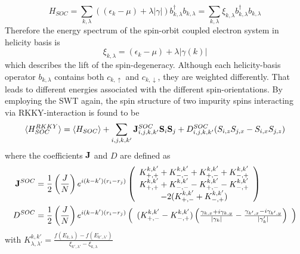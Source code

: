 \begin{equation}\label{eq:ham_nm+SOC}
    H_{SOC} = \sum_{k,\lambda} \left( (\epsilon_k-\mu) + \lambda |\gamma| \right) b^{\dag}_{k,\lambda}b_{k,\lambda} = \sum_{k, \lambda} \xi_{k, \lambda}b^{\dag}_{k,\lambda}b_{k,\lambda} 
\end{equation}
Therefore the energy spectrum of the spin-orbit coupled electron system in helicity basis is 
\begin{equation} \label{eq:energy_nm+SOC}
    \xi_{k, \lambda} = (\epsilon_k-\mu) + \lambda |\gamma(k)|
\end{equation}
which describes the lift of the spin-degeneracy.
Although each helicity-basis operator $b_{k,\lambda}$ contains both $c_{k,\uparrow}$ and $c_{k,\downarrow}$, they are weighted differently.
That leads to different energies associated with the different spin-orientations. \newline
By employing the SWT again, the spin structure of two impurity spins interacting via RKKY-interaction is found to be
\begin{align}\label{eq:nm_soc_spinStruct}
    \langle H^{RKKY}_{SOC} \rangle = \langle H_{SOC} \rangle + \sum_{i,j,k,k'}  \vb{J}^{SOC}_{i,j,k,k'} \vb{S}_i\vb{S}_j + D^{SOC}_{i,j,k,k'}(S_{i,z}S_{j,x}-S_{i,x}S_{j,z})
\end{align}
where the coefficients $\vb{J}$ and $D$ are defined as
\begin{align}\label{eq:nm_soc_spinCoeffi}
    \vb{J}^{SOC} &= \frac{1}{2}\left(\frac{J}{N}\right) e^{i(k-k')(r_i-r_j)}\left( 
    \begin{array}{c}
         K^{k,k'}_{+,+} +  K^{k,k'}_{-,-} +  K^{k,k'}_{+,-} +  K^{k,k'}_{-,+}\\
          K^{k,k'}_{+,+} +  K^{k,k'}_{-,-} -  K^{k,k'}_{+,-} -  K^{k,k'}_{-,+}\\
         -2 ( K^{k,k'}_{+,-} +  K^{k,k'}_{-,+})
    \end{array}
    \right) \\ \nonumber
    D^{SOC} &=\frac{1}{2}\left(\frac{J}{N}\right) e^{i(k-k')(r_i-r_j)}\left( 
    \begin{array}{c}
         ( K^{k,k'}_{+,-} -  K^{k,k'}_{-,+})\left(\frac{\gamma_{k,x} + i \gamma_{k,y}}{|\gamma_k|} - \frac{\gamma_{k',x} - i \gamma_{k',y}}{|\gamma_k'|}\right)
    \end{array}
    \right)
\end{align}
with $K^{k,k'}_{\lambda, \lambda'} = \frac{f(E_{k,\lambda}) - f(E_{k',\lambda'})}{\xi_{k',\lambda'}-\xi_{k,\lambda}}$ \newline
